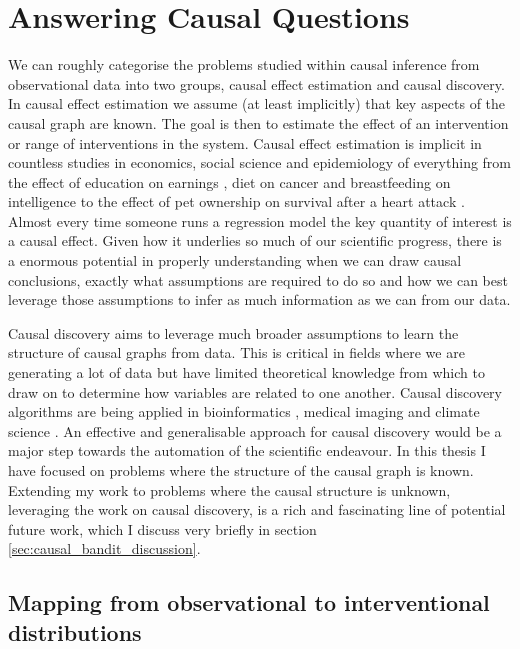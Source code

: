 \documentclass[11pt,a4paper,oneside]{book}
\theoremstyle{plain}
\theoremstyle{definition}
\begin{document}
\section{Answering Causal Questions} 
\label{sec:causal effect estimation}
We can roughly categorise the problems studied within causal inference from observational data into two groups, causal effect estimation and causal discovery. In causal effect estimation we assume (at least implicitly) that key aspects of the causal graph are known. The goal is then to estimate the effect of an intervention or range of interventions in the system. Causal effect estimation is implicit in countless studies in economics, social science and epidemiology of everything from the effect of education on earnings \citep{card1999causal}, diet on cancer \citep{bingham2004diet} and breastfeeding on intelligence \citep{jain2002good} to the effect of pet ownership on survival after a heart attack \citep{friedmann1995pet}. Almost every time someone runs a regression model the key quantity of interest is a causal effect. Given how it underlies so much of our scientific progress, there is a enormous potential in properly understanding when we can draw causal conclusions, exactly what assumptions are required to do so and how we can best leverage those assumptions to infer as much information as we can from our data. 

Causal discovery aims to leverage much broader assumptions to learn the structure of causal graphs from data. This is critical in fields where we are generating a lot of data but have limited theoretical knowledge from which to draw on to determine how variables are related to one another. Causal discovery algorithms are being applied in bioinformatics \citep{Bay2002,Sachs2005,Ram2006,Alekseyenko2011,Statnikov2012,Gao2015,Sokolova2015,Taruttis2015}, medical imaging \citep{Ramsey2010} and climate science \citep{Uphoff2013}. An effective and generalisable approach for causal discovery would be a major step towards the automation of the scientific endeavour. In this thesis I have focused on problems where the structure of the causal graph is known. Extending my work to problems where the causal structure is unknown, leveraging the work on causal discovery, is a rich and fascinating line of potential future work, which I discuss very briefly in section \ref{sec:causal_bandit_discussion}. 

\subsection{Mapping from observational to interventional distributions}
\end{document}
